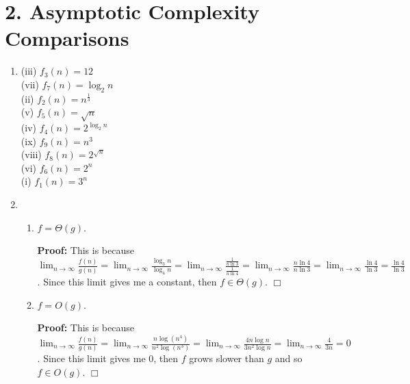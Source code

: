 \documentclass[11pt]{article}
\def\endproofmark{$\Box$}
\newenvironment{proof}{\par{\bf Proof:}}{\endproofmark\smallskip}
\begin{document}
\newpage
\section*{2. Asymptotic Complexity Comparisons}
\begin{enumerate}[label=(\alph*)]
\item
(iii) $f_3(n) = 12$ \\
(vii) $f_7(n) = \log_2n$ \\
(ii) $f_2(n) = n^{\frac{1}{3}}$ \\
(v) $f_5(n) = \sqrt{n}$ \\
(iv) $f_4(n) = 2^{\log_2n}$ \\
(ix) $f_9(n) = n^3$ \\
(viii) $f_8(n) = 2^{\sqrt{n}}$ \\
(vi) $f_6(n) = 2^n$ \\
(i) $f_1(n) = 3^n$

\item
\begin{enumerate}[label=(\roman*)]
\item
$f = \Theta(g)$.
\begin{proof}
This is because $\displaystyle{\lim_{n \to \infty} \frac{f(n)} {g(n)}} = \displaystyle{\lim_{n \to \infty} \frac{\log_3n} {\log_4n}} = \displaystyle{\lim_{n \to \infty} \frac{\frac{1} {n\ln{3}}} {\frac{1} {n\ln{4}}}} = \displaystyle{\lim_{n \to \infty} \frac{n\ln{4}} {n\ln{3}}} = \displaystyle{\lim_{n \to \infty} \frac{\ln{4}} {\ln{3}}} = \frac{\ln{4}} {\ln{3}}$. Since this limit gives me a constant, then $f \in \Theta(g)$.
\end{proof}

\item
$f = O(g)$.
\begin{proof}
This is because $\displaystyle{\lim_{n \to \infty} \frac{f(n)} {g(n)}} = \displaystyle{\lim_{n \to \infty} \frac{n\log{(n^4)}} {n^2\log{(n^3)}}} = \displaystyle{\lim_{n \to \infty} \frac{4n\log{n}} {3n^2\log{n}}} = \displaystyle{\lim_{n \to \infty} \frac{4} {3n}} = 0$. Since this limit gives me 0, then $f$ grows slower than $g$ and so $f \in O(g)$.
\end{proof}


\end{enumerate}
\end{enumerate}
\end{document}
